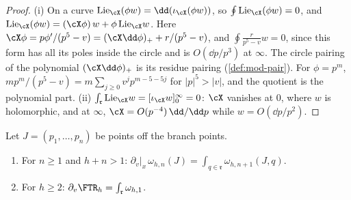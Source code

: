 \begin{proof}
(i) On a curve $\mathrm{Lie}_{\cX}(\phi w)=\dd(\iota_{\cX}(\phi w))$, so $\oint\mathrm{Lie}_{\cX}(\phi w)=0$, and $\mathrm{Lie}_{\cX}(\phi w)=(\cX\phi)\,w+\phi\,\mathrm{Lie}_{\cX}w$. Here $\cX\phi=p\phi'/(p^5-v)=(\cX\dd\phi)_++r/(p^5-v)$, and $\oint\frac{r}{p^5-v}w=0$, since this form has all its poles inside the circle and is $O(\dd p/p^3)$ at $\infty$. The circle pairing of the polynomial $(\cX\dd\phi)_+$ is its residue pairing (\cref{def:mod-pair}). For $\phi=p^m$, $mp^m/(p^5-v)=m\sum_{j\geq 0}v^jp^{m-5-5j}$ for $|p|^5>|v|$, and the quotient is the polynomial part. (ii) $\int_{\mathfrak r}\mathrm{Lie}_{\cX}w=[\iota_{\cX}w]_0^\infty=0$: $\cX$ vanishes at $0$, where $w$ is holomorphic, and at $\infty$, $\cX=O(p^{-4})\,\dd/\dd p$ while $w=O(\dd p/p^2)$.
\end{proof}

\begin{thm}
\label{thm:mod-var}
Let $J=(p_1,\dots,p_n)$ be points off the branch points.
\begin{enumerate}
\item For $n\geq 1$ and $h+n>1$: $\partial_v|_x\,\omega_{h,n}(J)=\int_{q\in\mathfrak r}\omega_{h,n+1}(J,q)$.
\item For $h\geq 2$: $\partial_v\FTR_h=\int_{\mathfrak r}\omega_{h,1}$.
\end{enumerate}
\end{thm}

